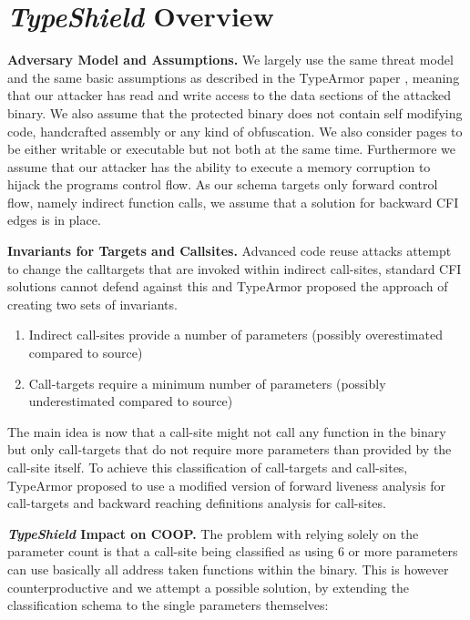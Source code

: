 \section{\textit{TypeShield} Overview}
\label{chapter:TypeShild Overview}

\textbf{Adversary Model and Assumptions.}
\label{Adversary Model}
We largely use the same threat model and the same basic assumptions as described in the TypeArmor 
paper \cite{veen:typearmor}, meaning that our attacker has read and write access to the data 
sections of the attacked binary.  We also assume that the protected binary does not contain 
self modifying code, handcrafted assembly or any kind of obfuscation. We also consider pages 
to be either writable or executable but not both at the same time. Furthermore we assume 
that our attacker has the ability to execute a memory corruption to hijack the programs 
control flow. As our schema targets only forward control flow, namely indirect function 
calls, we assume that a solution for backward CFI edges is in place.

\textbf{Invariants for Targets and Callsites.}
\label{Invariants for Targets and Callsites}
Advanced code reuse attacks attempt to change the calltargets that are invoked within indirect 
call-sites, standard CFI solutions cannot defend against this and TypeArmor proposed the approach
of creating two sets of invariants. 

\begin{enumerate}
\item Indirect call-sites provide a number of parameters (possibly overestimated compared to source)
\item Call-targets require a minimum number of parameters (possibly underestimated compared to source)
\end{enumerate}

The main idea is now that a call-site might not call any function in the binary but only call-targets
that do not require more parameters than provided by the call-site itself. To achieve this classification
of call-targets and call-sites, TypeArmor proposed to use a modified version of forward liveness analysis
for call-targets and backward reaching definitions analysis for call-sites.


\textbf{\textit{TypeShield} Impact on COOP.}
\label{TypeShild Impact on COOP}
The problem with relying solely on the parameter count is that a call-site being classified as using
6 or more parameters can use basically all address taken functions within the binary. This is however
counterproductive and we attempt a possible solution, by extending the classification schema to the
single parameters themselves:

